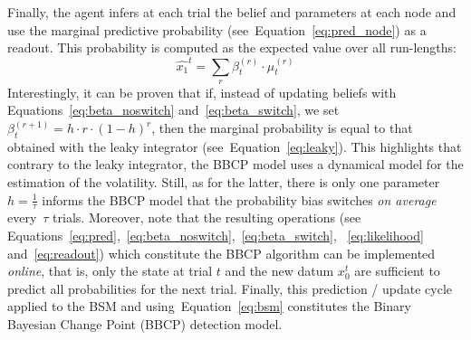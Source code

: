 \documentclass[12pt,english]{article}%
\newcommand{\eql}[1]{\begin{equation}#1\end{equation}}
\DeclareMathOperator{\argmax}{argmax}
\newcommand{\seeEq}[1]{Equation~\ref{eq:#1}}
\begin{document}
Finally, the agent infers at each trial the belief and parameters at each node
and use the marginal predictive probability (see~\seeEq{pred_node}) as a readout.
This probability is computed as the expected value over all run-lengths:
\eql{
\hat{x_1}^t = \sum_{r} \beta^{(r)}_{t} \cdot \mu^{(r)}_{t}
\label{eq:readout}
}
Interestingly, it can be proven that if,
instead of updating beliefs with Equations~\ref{eq:beta_noswitch} and~\ref{eq:beta_switch},
we set $\beta^{(r+1)}_t = h \cdot r \cdot (1 -h) ^r$, then the marginal probability
is equal to that obtained with the leaky integrator (see~\seeEq{leaky}).
This highlights that contrary to the leaky integrator, %
the BBCP model uses a dynamical model for the estimation of the volatility.
Still, as for the latter, there is only one parameter~$h=\frac 1 \tau$ informs the BBCP model
that the probability bias switches \emph{on average} every~$\tau$ trials.
Moreover, note that the resulting operations
(see Equations~\ref{eq:pred},~\ref{eq:beta_noswitch},~\ref{eq:beta_switch}, ~\ref{eq:likelihood} and~\ref{eq:readout})
which constitute the BBCP algorithm
can be implemented \textit{online}, that is,
only the state at trial $t$ and the new datum $x_0^t$
are sufficient to predict all probabilities for the next trial.
Finally, this prediction / update cycle applied to the BSM and using~\seeEq{bsm}
constitutes the Binary Bayesian Change Point (BBCP) detection model.

\end{document}
